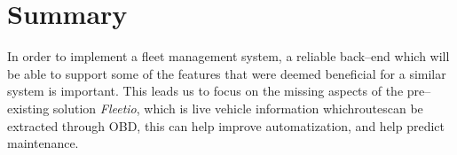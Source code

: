 \section{Summary}\label{sub:Assessment}
In order to implement a fleet management system, a reliable back--end which will be able to support some of the features that were deemed beneficial for a similar system is important.
This leads us to focus on the missing aspects of the pre--existing solution \textit{Fleetio}, which is live vehicle information whichroutescan be extracted through \ac{OBD}, this can help improve automatization, and help predict maintenance.

